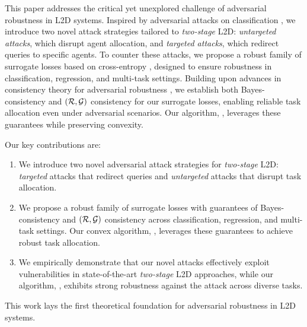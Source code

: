 This paper addresses the critical yet unexplored challenge of adversarial robustness in L2D systems. Inspired by adversarial attacks on classification \citep{goodfellow2014explaining, Madry2017TowardsDL, Gowal2020UncoveringTL}, we introduce two novel attack strategies tailored to \emph{two-stage} L2D: \textit{untargeted attacks}, which disrupt agent allocation, and \textit{targeted attacks}, which redirect queries to specific agents. To counter these attacks, we propose a robust family of surrogate losses based on cross-entropy \citep{mao2023twostage, mao2024regressionmultiexpertdeferral, montreuil2024twostagelearningtodefermultitasklearning}, designed to ensure robustness in classification, regression, and multi-task settings. Building upon advances in consistency theory for adversarial robustness \citep{bao2021calibratedsurrogatelossesadversarially, Awasthi_Mao_Mohri_Zhong_2022_multi, Grounded, mao2023crossentropylossfunctionstheoretical}, we establish both Bayes-consistency and $(\mathcal{R},\mathcal{G})$ consistency for our surrogate losses, enabling reliable task allocation even under adversarial scenarios. Our algorithm, \textbf{\name}, leverages these guarantees while preserving convexity.


Our key contributions are:
\begin{enumerate}
    \item We introduce two novel adversarial attack strategies for \emph{two-stage} L2D: \textit{targeted} attacks that redirect queries and \textit{untargeted} attacks that disrupt task allocation.
    \item We propose a robust family of surrogate losses with guarantees of Bayes-consistency and $(\mathcal{R}, \mathcal{G})$ consistency across classification, regression, and multi-task settings. Our convex algorithm, \name, leverages these guarantees to achieve robust task allocation.
    \item We empirically demonstrate that our novel attacks effectively exploit vulnerabilities in state-of-the-art \emph{two-stage} L2D approaches, while our algorithm, \name, exhibits strong robustness against the attack across diverse tasks.
\end{enumerate}



This work lays the first theoretical foundation for adversarial robustness in L2D systems.
